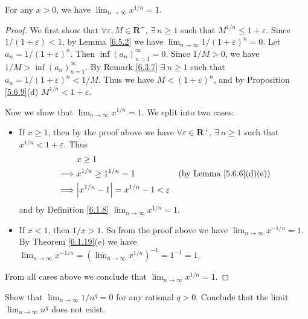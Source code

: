 \begin{lemma}\label{6.5.3}
    For any \(x > 0\), we have \(\lim_{n \to \infty} x^{1 / n} = 1\).
\end{lemma}

\begin{proof}
    We first show that \(\forall \varepsilon, M \in \mathbf{R}^+\), \(\exists\ n \geq 1\) such that \(M^{1 / n} \leq 1 + \varepsilon\).
    Since \(1 / (1 + \varepsilon) < 1\), by Lemma \ref{6.5.2} we have \(\lim_{n \to \infty} 1 / (1 + \varepsilon)^n = 0\).
    Let \(a_n = 1 / (1 + \varepsilon)^n\).
    Then \(\inf(a_n)_{n = 1}^\infty = 0\).
    Since \(1 / M > 0\), we have \(1 / M > \inf(a_n)_{n = 1}^\infty\).
    By Remark \ref{6.3.7} \(\exists\ n \geq 1\) such that \(a_n = 1 / (1 + \varepsilon)^n < 1 / M\).
    Thus we have \(M < (1 + \varepsilon)^n\), and by Proposition \ref{5.6.9}(d) \(M^{1 / n} < 1 + \varepsilon\).

    Now we show that \(\lim_{n \to \infty} x^{1 / n} = 1\).
    We split into two cases:
    \begin{itemize}
        \item If \(x \geq 1\), then by the proof above we have \(\forall \varepsilon \in \mathbf{R}^+\), \(\exists\ n \geq 1\) such that \(x^{1 / n} < 1 + \varepsilon\).
              Thus
              \begin{align*}
                           & x \geq 1                                                                                 \\
                  \implies & x^{1 / n} \geq 1^{1 / n} = 1                       & \text{(by Lemma \ref{5.6.6}(d)(e))} \\
                  \implies & \abs*{x^{1 / n} - 1} = x^{1 / n} - 1 < \varepsilon
              \end{align*}
              and by Definition \ref{6.1.8} \(\lim_{n \to \infty} x^{1 / n} = 1\).
        \item If \(x < 1\), then \(1 / x > 1\).
              So from the proof above we have \(\lim_{n \to \infty} x^{-1 / n} = 1\).
              By Theorem \ref{6.1.19}(e) we have \(\lim_{n \to \infty} x^{-1 / n} = (\lim_{n \to \infty} x^{1 / n})^{-1} = 1^{-1} = 1\).
    \end{itemize}
    From all cases above we conclude that \(\lim_{n \to \infty} x^{1 / n} = 1\).
\end{proof}

\exercisesection

\begin{exercise}\label{ex 6.5.1}
    Show that \(\lim_{n \to \infty} 1 / n^q = 0\) for any rational \(q > 0\).
    Conclude that the limit \(\lim_{n \to \infty} n^q\) does not exist.
\end{exercise}

